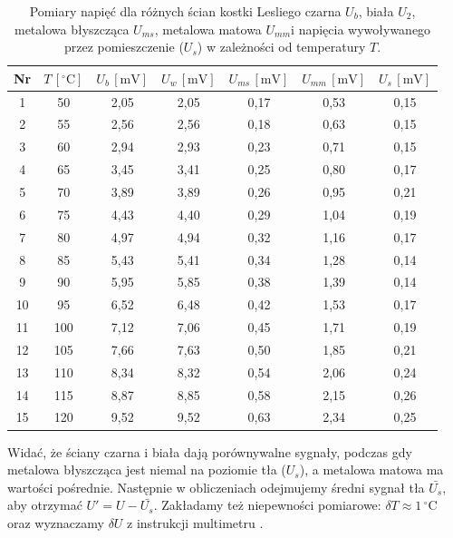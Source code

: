 \documentclass[12pt]{article}
\begin{document}
\begin{table}[H]
	\centering
	\begin{tabular}{c|c|cccc|c}
		\toprule
		Nr & $T\,[^\circ \mathrm{C}]$ & $U_b\,[\mathrm{mV}]$ & $U_w\,[\mathrm{mV}]$ & $U_{ms}\,[\mathrm{mV}]$ & $U_{mm}\,[\mathrm{mV}]$ & $U_s\,[\mathrm{mV}]$ \\
		\midrule
		1  & 50 & 2{,}05 & 2{,}05 & 0{,}17 & 0{,}53 & 0{,}15 \\
		2  & 55 & 2{,}56 & 2{,}56 & 0{,}18 & 0{,}63 & 0{,}15 \\
		3  & 60 & 2{,}94 & 2{,}93 & 0{,}23 & 0{,}71 & 0{,}15 \\
		4  & 65 & 3{,}45 & 3{,}41 & 0{,}25 & 0{,}80 & 0{,}17 \\
		5  & 70 & 3{,}89 & 3{,}89 & 0{,}26 & 0{,}95 & 0{,}21 \\
		6  & 75 & 4{,}43 & 4{,}40 & 0{,}29 & 1{,}04 & 0{,}19 \\
		7  & 80 & 4{,}97 & 4{,}94 & 0{,}32 & 1{,}16 & 0{,}17 \\
		8  & 85 & 5{,}43 & 5{,}41 & 0{,}34 & 1{,}28 & 0{,}14 \\
		9  & 90 & 5{,}95 & 5{,}85 & 0{,}38 & 1{,}39 & 0{,}14 \\
		10 & 95 & 6{,}52 & 6{,}48 & 0{,}42 & 1{,}53 & 0{,}17 \\
		11 & 100 & 7{,}12 & 7{,}06 & 0{,}45 & 1{,}71 & 0{,}19 \\
		12 & 105 & 7{,}66 & 7{,}63 & 0{,}50 & 1{,}85 & 0{,}21 \\
		13 & 110 & 8{,}34 & 8{,}32 & 0{,}54 & 2{,}06 & 0{,}24 \\
		14 & 115 & 8{,}87 & 8{,}85 & 0{,}58 & 2{,}15 & 0{,}26 \\
		15 & 120 & 9{,}52 & 9{,}52 & 0{,}63 & 2{,}34 & 0{,}25 \\
		\bottomrule
	\end{tabular}
    \caption{Pomiary napięć dla różnych ścian kostki Lesliego czarna $U_b$, biała $U_2$, metalowa błyszcząca $U_{ms}$, metalowa matowa $U_{mm}$i napięcia wywoływanego przez pomieszczenie ($U_s$) w zależności od temperatury $T$.}
	\label{tab:cube_measurements}
\end{table}

Widać, że ściany czarna i biała dają porównywalne sygnały, podczas gdy metalowa błyszcząca jest niemal na poziomie tła ($U_s$), a metalowa matowa ma wartości pośrednie. Następnie w obliczeniach odejmujemy średni sygnał tła $\bar{U_s}$, aby otrzymać $U' = U - \bar{U_s}$. Zakładamy też niepewności pomiarowe: $\delta T \approx 1\,^\circ\mathrm{C}$ oraz wyznaczamy $\delta U$ z instrukcji multimetru \cite{radiation_multimeter}.
\end{document}
